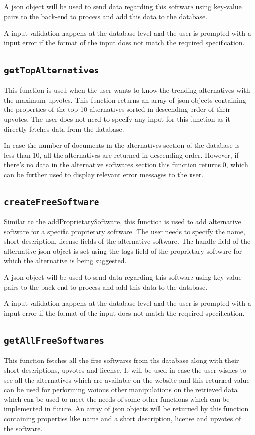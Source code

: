 A json object will be used to send data regarding this software using key-value pairs to the back-end to process and add this data to the database.

A input validation happens at the database level and the user is prompted with a input error if the format of the input does not match the required specification.

\subsection{\texttt{getTopAlternatives}}
This function is used when the user wants to know the trending alternatives with the maximum upvotes. This function returns an array of json objects containing the properties of the top 10 alternatives sorted in descending order of their upvotes. The user does not need to specify any input for this function as it directly fetches data from the database. 

In case the number of documents in the alternatives section of the database is less than 10, all the alternatives are returned in descending order. However, if there’s no data in the alternative softwares section this function returns 0, which can be further used to display relevant error messages to the user.

\subsection{\texttt{createFreeSoftware}}
Similar to the addProprietarySoftware, this function is used to add alternative software for a specific proprietary software. The user needs to specify the name, short description, license fields of the alternative software. The handle field of the alternative json object is set using the tags field of the proprietary software for which the alternative is being suggested.

A json object will be used to send data regarding this software using key-value pairs to the back-end to process and add this data to the database.

A input validation happens at the database level and the user is prompted with a input error if the format of the input does not match the required specification.

\subsection{\texttt{getAllFreeSoftwares}}
This function fetches all the free softwares from the database along with their short descriptions, upvotes and license. It will be used in case the user wishes to see all the alternatives which are available on the website and this returned value can be used for performing various other manipulations on the retrieved data which can be used to meet the needs of some other functions which can be implemented in future.
An array of json objects will be returned by this function containing properties like name and a short description, license and upvotes of the software. 

